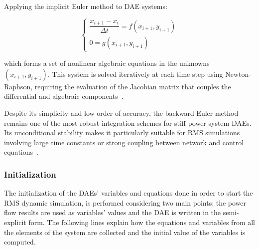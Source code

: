Applying the implicit Euler method to DAE systems:

\begin{equation}
    \begin{cases}
        \dfrac{x_{i+1} - x_i}{\Delta t} = f(x_{i+1}, y_{i+1}) \\
        0 = g(x_{i+1}, y_{i+1})
    \end{cases}
    \label{eq:dae_implicit_step}
\end{equation}

which forms a set of nonlinear algebraic equations in the unknowns $(x_{i+1}, y_{i+1})$. This system is solved iteratively at each time step using Newton-Raphson,
requiring the evaluation of the Jacobian matrix that couples the differential and algebraic components~\cite{Hindmarsh1995}. 

Despite its simplicity and low order of accuracy, the backward Euler method remains one of the most robust integration schemes for stiff power system DAEs.
Its unconditional stability makes it particularly suitable for RMS simulations involving large time constants or strong coupling between network and control equations~\cite{LaraTDS}.


\subsubsection{Initialization}

The initialization of the DAEs' variables and equations done in order to start the RMS dynamic simulation, is performed considering two main points: the power flow results
are used as variables' values and the DAE is written in the semi-explicit form. The following lines explain how the equations and variables from all the elements of the 
system are collected and the initial value of the variables is computed.

